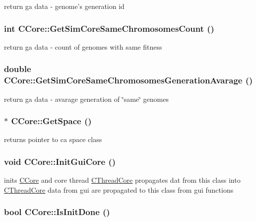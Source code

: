 \label{classCCore_a18ce09c76b45dd18a7932c4832f61300}
return ga data -\/ genome's generation id \hypertarget{classCCore_a07b0206d4fc75b23bd8da7660d8efc1a}{
\subsubsection[{GetSimCoreSameChromosomesCount}]{\setlength{\rightskip}{0pt plus 5cm}int CCore::GetSimCoreSameChromosomesCount ()}}
\label{classCCore_a07b0206d4fc75b23bd8da7660d8efc1a}
return ga data -\/ count of genomes with same fitness \hypertarget{classCCore_aa6634f29c320ed9110ce82eed156b05d}{
\subsubsection[{GetSimCoreSameChromosomesGenerationAvarage}]{\setlength{\rightskip}{0pt plus 5cm}double CCore::GetSimCoreSameChromosomesGenerationAvarage ()}}
\label{classCCore_aa6634f29c320ed9110ce82eed156b05d}
return ga data -\/ avarage generation of \char`\"{}same\char`\"{} genomes \hypertarget{classCCore_a3eebffde003b3ae3e724136521739e12}{
\subsubsection[{GetSpace}]{ $\ast$ CCore::GetSpace ()}}
\label{classCCore_a3eebffde003b3ae3e724136521739e12}
returns pointer to ca space class \hypertarget{classCCore_abf803abecd356eca5edff06f3ca6be33}{
\subsubsection[{InitGuiCore}]{\setlength{\rightskip}{0pt plus 5cm}void CCore::InitGuiCore ()}}
\label{classCCore_abf803abecd356eca5edff06f3ca6be33}
inits \hyperlink{classCCore}{CCore} and core thread \hyperlink{classCThreadCore}{CThreadCore} propagates dat from this class into \hyperlink{classCThreadCore}{CThreadCore} data from gui are propagated to this class from gui functions \hypertarget{classCCore_a9cc1459df131a2757809f13e2af2bf9e}{
\subsubsection[{IsInitDone}]{\setlength{\rightskip}{0pt plus 5cm}bool CCore::IsInitDone ()}}
